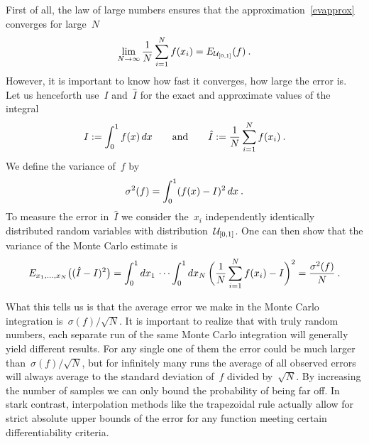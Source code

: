 First of all, the law of large numbers ensures that the
approximation~\eqref{evapprox} converges for large~$N$
%
\begin{equation}
  \lim_{N \to \infty} \frac{1}{N} \sum_{i = 1}^N f(x_i) = E_{\mathcal{U}_{[0,1]}}(f)\:.
\end{equation}
%
However, it is important to know how fast it converges, \ie{} how large the
error is. Let us henceforth use~$I$ and~$\hat{I}$ for the exact and approximate
values of the integral
%
\begin{equation}
  I := \int_0^1 f(x) \,dx \qquad\text{and}\qquad
  \hat{I} := \frac{1}{N} \sum_{i=1}^N f(x_i)\:.
\end{equation}
%
We define the variance of~$f$ by
%
\begin{equation}
  \sigma^2(f) = \int_0^1 (f(x) - I)^2 \,dx\:.
\end{equation}
%
To measure the error in~$\hat{I}$ we consider the~$x_i$ independently
identically distributed random variables with distribution~$\mathcal{U}_{[0,1]}$. One
can then show that the variance of the Monte Carlo estimate is
%
\begin{equation}\label{mcerror}
  E_{x_1, \dots , x_N}\bigl((\hat{I} - I)^2\bigr) =
  \int_0^1 dx_1\, \cdots \int_0^1 dx_N\,
  \biggl(\frac{1}{N} \sum_{i=1}^N f(x_i) - I\biggr)^2 =
  \frac{\sigma^2(f)}{N}\:.
\end{equation}

What this tells us is that the average error we make in the Monte Carlo
integration is~$\sigma(f)/\sqrt{N}$. It is important to realize that with truly
random numbers, each separate run of the same Monte Carlo integration will
generally yield different results. For any single one of them the error could be
much larger than~$\sigma(f)/\sqrt{N}$, but for infinitely many runs the average
of all observed errors will always average to the standard deviation of~$f$
divided by~$\sqrt{N}$. By increasing the number of samples we can only bound the
probability of being far off. In stark contrast, interpolation methods like the
trapezoidal rule actually allow for strict absolute upper bounds of the error
for any function meeting certain differentiability criteria.


